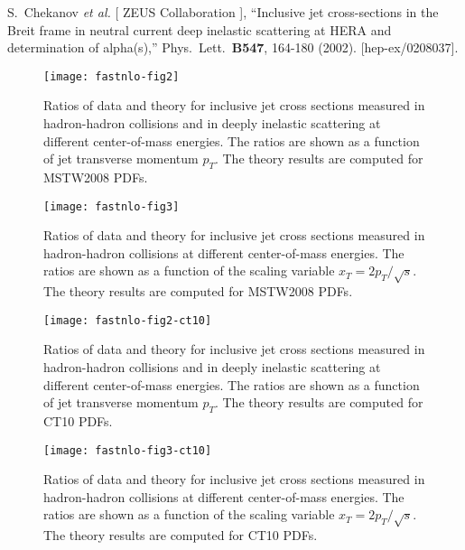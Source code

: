 \documentclass[11pt]{article}
\begin{document}
\begin{thebibliography}{99}
  S.~Chekanov {\it et al.} [ ZEUS Collaboration ],
  ``Inclusive jet cross-sections in the Breit frame in neutral current deep inelastic scattering at HERA and determination of alpha(s),''
  Phys.\ Lett.\  {\bf B547}, 164-180 (2002).
  [hep-ex/0208037].






\end{thebibliography}




\begin{figure}
  \centerline{
\texttt{[image: fastnlo-fig2]}%
}
\caption{\label{fig:incljets}
Ratios of data and theory for inclusive jet cross sections
measured in hadron-hadron collisions and in deeply inelastic scattering
at different center-of-mass energies.
The ratios are shown as a function of jet transverse momentum $p_T$.
The theory results are computed for MSTW2008 PDFs.
}
\end{figure}

\begin{figure}
  \centerline{
\texttt{[image: fastnlo-fig3]}%
}
\caption{\label{fig:ppjetsxt}
Ratios of data and theory for inclusive jet cross sections
measured in hadron-hadron collisions
at different center-of-mass energies.
The ratios are shown as a function of the scaling variable
$x_T = 2p_T/\sqrt{s}$.
The theory results are computed for MSTW2008 PDFs.
}
\end{figure}


\begin{figure}
  \centerline{
\texttt{[image: fastnlo-fig2-ct10]}%
}
\caption{\label{fig:incljets-ct10}
Ratios of data and theory for inclusive jet cross sections
measured in hadron-hadron collisions and in deeply inelastic scattering
at different center-of-mass energies.
The ratios are shown as a function of jet transverse momentum $p_T$.
The theory results are computed for CT10 PDFs.}
\end{figure}


\begin{figure}
  \centerline{
\texttt{[image: fastnlo-fig3-ct10]}%
}
\caption{\label{fig:ppjetsxt-ct10}
Ratios of data and theory for inclusive jet cross sections
measured in hadron-hadron collisions
at different center-of-mass energies.
The ratios are shown as a function of the scaling variable
$x_T = 2p_T/\sqrt{s}$.
The theory results are computed for CT10 PDFs.}
\end{figure}
\end{document}
